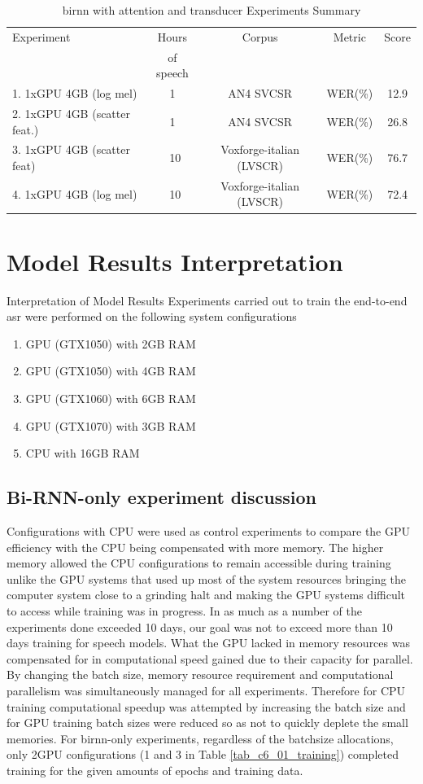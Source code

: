\begin{table}
  \caption{\acrshort{birnn} with attention and transducer Experiments Summary}
  \label{tab_c6_04_training}
\begin{tabular}{lcccc}
\toprule
Experiment & Hours & Corpus & Metric & Score\\& of speech\\
\midrule
1. 1xGPU 4GB (log mel) & 1 & AN4 SVCSR & WER(\%) & 12.9\\
2. 1xGPU 4GB (scatter feat.) & 1 & AN4 SVCSR & WER(\%) & 26.8 \\
3. 1xGPU 4GB (scatter feat) & ~10 & Voxforge-italian (LVSCR) & WER(\%) & 76.7 \\
4. 1xGPU 4GB (log mel) & ~10 &  Voxforge-italian (LVSCR) & WER(\%) & 72.4\\
\bottomrule
\end{tabular}
\end{table}

\section{Model Results Interpretation}
Interpretation of Model Results
Experiments carried out to train the end-to-end \acrshort{asr} were performed on the following system configurations
\begin{enumerate}
    \item GPU (GTX1050) with 2GB RAM
    \item GPU (GTX1050) with 4GB RAM
    \item GPU (GTX1060) with 6GB RAM
    \item GPU (GTX1070) with 3GB RAM
    \item CPU with 16GB RAM
\end{enumerate}

\subsection{Bi-RNN-only experiment discussion}
Configurations with CPU were used as control experiments to compare the GPU efficiency with the CPU being compensated with more memory.  The higher memory allowed the CPU configurations to remain accessible during training unlike the GPU systems that used up most of the system resources bringing the computer system close to a grinding halt and making the GPU systems difficult to access while training was in progress.  In as much as a number of the experiments done exceeded 10 days, our goal was not to exceed more than 10 days training for speech models.  What the GPU lacked in memory resources was compensated for in computational speed gained due to their capacity for parallel.  By changing the batch size, memory resource requirement and computational parallelism was simultaneously managed for all experiments.  Therefore for CPU training computational speedup was attempted by increasing the batch size and for GPU training batch sizes were reduced so as not to quickly deplete the small memories.  For \acrshort{birnn}-only experiments, regardless of the batchsize allocations, only 2GPU configurations  (1 and 3 in Table \ref{tab_c6_01_training}) completed training for the given amounts of epochs and training data.

